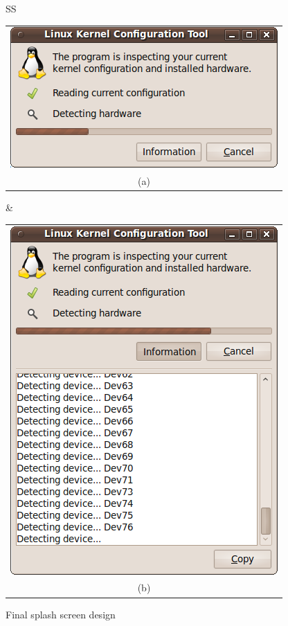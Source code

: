 \documentclass{chi2009}
\begin{document}
\begin{figure}[!t]
 \centering
\begin{tabular}{SS}
 \begin{tabular}{c}
  \includegraphics[scale=0.5,keepaspectratio=true]{figs/splash-final1.png} \\
  (a) \\
 \end{tabular}
  & 
\begin{tabular}{c}
  \includegraphics[scale=0.5,keepaspectratio=true]{figs/splash-final2.png} \\
  (b) \\
 \end{tabular}
\end{tabular}
\caption{Final splash screen design}
\label{fig:splash-final}
\end{figure}
\end{document}
